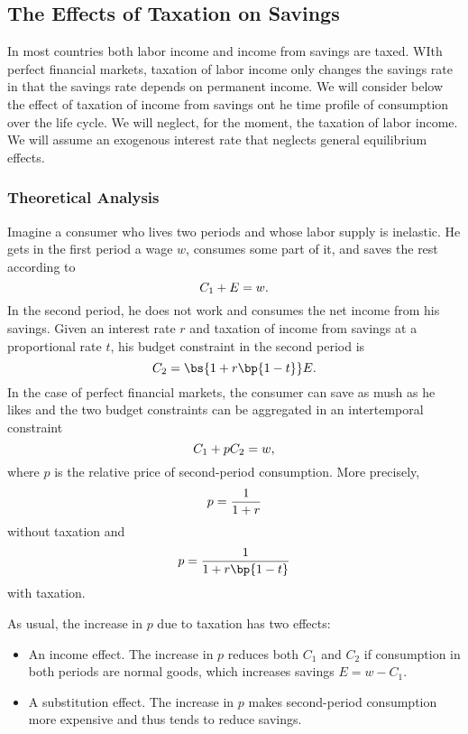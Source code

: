 \subsection{The Effects of Taxation on Savings}

In most countries both labor income and income from savings are taxed. WIth perfect financial markets, taxation of labor income only changes the savings rate in that the savings rate depends on permanent income. We will consider below the effect of taxation of income from savings ont he time profile of consumption over the life cycle. We will neglect, for the moment, the taxation of labor income. We will assume an exogenous interest rate that neglects general equilibrium effects.

\subsubsection{Theoretical Analysis}

Imagine a consumer who lives two periods and whose labor supply is inelastic. He gets in the first period a wage $w$, consumes some part of it, and saves the rest according to 
\begin{equation}
    \notag 
    C_1 + E = w .
\end{equation}
In the second period, he does not work and consumes the net income from his savings. Given an interest rate $r$ and taxation of income from savings at a proportional rate $t$, his budget constraint in the second period is 
\begin{equation}
    \notag 
    C_2 = \bs{1 + r\bp{1-t}} E.
\end{equation}
In the case of perfect financial markets, the consumer can save as mush as he likes and the two budget constraints can be aggregated in an intertemporal constraint
\begin{equation}
    \notag 
    C_1 + p C_2 = w,
\end{equation}
where $p$ is the relative price of second-period consumption. More precisely, 
\begin{equation}
    \notag 
    p = \frac{1}{1+r}
\end{equation}
without taxation and 
\begin{equation}
    \notag 
    p = \frac{1}{1 + r\bp{1-t}}
\end{equation}
with taxation.

As usual, the increase in $p$ due to taxation has two effects:
\begin{itemize}[topsep=0pt, leftmargin=20pt, itemsep=0pt]
	\setlength{\parskip}{10pt} 
	\item An income effect. The increase in $p$ reduces both $C_1$ and $C_2$ if consumption in both periods are normal goods, which increases savings $E = w - C_1$.
	\item A substitution effect. The increase in $p$ makes second-period consumption more expensive and thus tends to reduce savings.
\end{itemize}

